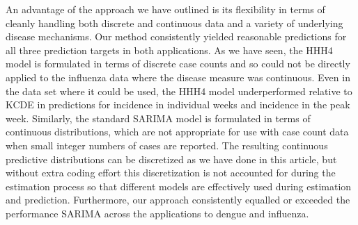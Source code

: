\documentclass[times, doublespace]{simauth}\usepackage[]{graphicx}\usepackage[]{color}
\begin{document}

An advantage of the approach we have outlined is its flexibility in terms
of cleanly handling both discrete and continuous data and a variety of
underlying disease mechanisms.
Our method consistently yielded reasonable predictions for all three prediction
targets in both applications. As we have seen, the HHH4 model is
formulated in terms of discrete case counts and so could not be directly
applied to the influenza data where the disease measure was continuous.  Even in
the data set where it could be used, the HHH4 model
underperformed relative to KCDE in predictions for incidence in individual weeks
and incidence in the peak week.  Similarly, the standard
SARIMA model is formulated in terms of continuous distributions, which are not
appropriate for use with case count data when small integer numbers of cases
are reported.  The resulting continuous predictive distributions can be discretized as we have
done in this article, but without extra coding effort this discretization is not
accounted for during the estimation process so that different models are effectively
used during estimation and prediction.  Furthermore, our approach consistently
equalled or exceeded the performance SARIMA across the applications to dengue
and influenza.

\end{document}
